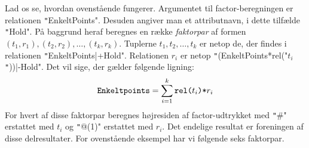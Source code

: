 \documentclass{article}
\newcounter{eks}
\begin{document}

Lad os se, hvordan ovenst\aa{}ende fungerer. Argumentet til factor-be\-reg\-ning\-en
er relationen \texttt"EnkeltPoints". Desuden angiver man et attributnavn, i dette
tilf\ae{}lde \texttt"Hold". P\aa{} baggrund heraf beregnes en r\ae{}kke {\em faktorpar} af
formen $(t_1,r_1),(t_2,r_2),\ldots,(t_k,r_k)$. Tuplerne 
$t_1,t_2,\ldots,t_k$ er netop de, der findes i relationen
\texttt"EnkeltPoints|+Hold". Relationen $r_i$ er netop
\texttt"(EnkeltPoints*rel("$t_i$\texttt"))|-Hold". Det vil sige, der g\ae{}lder
f\o{}lgende ligning:
$$\mbox{\tt Enkeltpoints} = \sum_{i=1}^k \mbox{\tt rel(}t_i\mbox{\tt )*}r_i$$ 
For hvert af disse faktorpar beregnes h\o{}jresiden af factor-udtrykket med
\texttt"#" erstattet med $t_i$ og \texttt"@(1)" erstattet med $r_i$. Det
endelige resultat er foreningen af disse delresultater. For ovenst\aa{}ende
eksempel har vi f\o{}lgende seks faktorpar.
\end{document}
